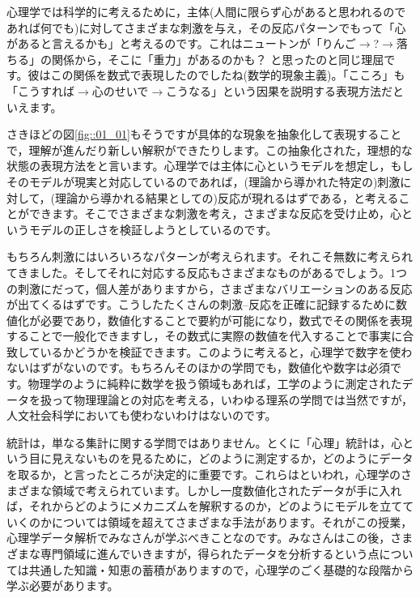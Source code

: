 \documentclass{ltjsbook}
\begin{document}
心理学では科学的に考えるために，主体(人間に限らず心があると思われるのであれば何でも)に対してさまざまな刺激を与え，その反応パターンでもって「心があると言えるかも」と考えるのです。これはニュートンが「りんご$\to$?$\to$落ちる」の関係から，そこに「重力」があるのかも？ と思ったのと同じ理屈です。彼はこの関係を数式で表現したのでしたね(数学的現象主義)。「こころ」も「こうすれば$\to$心のせいで$\to$こうなる」という因果を説明する表現方法だといえます。

さきほどの図\ref{fig::01_01}もそうですが具体的な現象を抽象化して表現することで，理解が進んだり新しい解釈ができたりします。この抽象化された，理想的な状態の表現方法をと言います。心理学では主体に心というモデルを想定し，もしそのモデルが現実と対応しているのであれば，(理論から導かれた特定の)刺激に対して，(理論から導かれる結果としての)反応が現れるはずである，と考えることができます。そこでさまざまな刺激を考え，さまざまな反応を受け止め，心というモデルの正しさを検証しようとしているのです。

もちろん刺激にはいろいろなパターンが考えられます。それこそ無数に考えられてきました。そしてそれに対応する反応もさまざまなものがあるでしょう。1つの刺激にだって，個人差がありますから，さまざまなバリエーションのある反応が出てくるはずです。こうしたたくさんの刺激--反応を正確に記録するために数値化が必要であり，数値化することで要約が可能になり，数式でその関係を表現することで一般化できますし，その数式に実際の数値を代入することで事実に合致しているかどうかを検証できます。このように考えると，心理学で数字を使わないはずがないのです。もちろんそのほかの学問でも，数値化や数字は必須です。物理学のように純粋に数学を扱う領域もあれば，工学のように測定されたデータを扱って物理理論との対応を考える，いわゆる理系の学問では当然ですが，人文社会科学においても使わないわけはないのです。

統計は，単なる集計に関する学問ではありません。とくに「心理」統計は，心という目に見えないものを見るために，どのように測定するか，どのようにデータを取るか，と言ったところが決定的に重要です。これらはといわれ，心理学のさまざまな領域で考えられています。しかし一度数値化されたデータが手に入れば，それからどのようにメカニズムを解釈するのか，どのようにモデルを立てていくのかについては領域を超えてさまざまな手法があります。それがこの授業，心理学データ解析でみなさんが学ぶべきことなのです。みなさんはこの後，さまざまな専門領域に進んでいきますが，得られたデータを分析するという点については共通した知識・知恵の蓄積がありますので，心理学のごく基礎的な段階から学ぶ必要があります。
\end{document}
